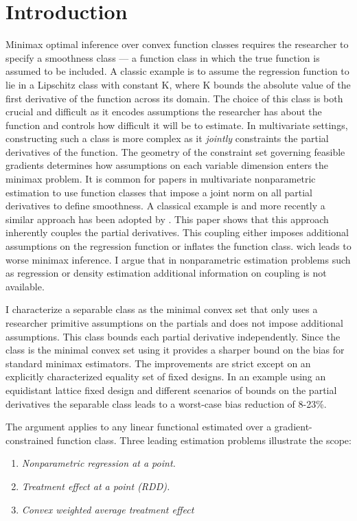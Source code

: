 
\section{Introduction}\label{sec:introduction}

Minimax optimal inference over convex function classes requires the researcher to specify a smoothness class --- a function class in which the true function is assumed to be included. A classic example is to assume the regression function to lie in a Lipschitz class with constant K, where K bounds the absolute value of the first derivative of the function across its domain. The choice of this class is both crucial and difficult as it encodes assumptions the researcher has about the function and controls how difficult it will be to estimate. In multivariate settings, constructing such a class is more complex as it \emph{jointly} constraints the partial derivatives of the function. The geometry of the constraint set governing feasible gradients determines how assumptions on each variable dimension enters the minimax problem.
It is common for papers in multivariate nonparametric estimation to use function classes that impose a joint norm on all partial derivatives to define smoothness. A classical example is \textcite{stone_optimal_1980} and more recently a similar approach has been adopted by \textcite{imbens_optimized_2019}.
This paper shows that this approach inherently couples the partial derivatives. This coupling either imposes additional assumptions on the regression function or inflates the function class. wich leads to worse minimax inference. I argue that in nonparametric estimation problems such as regression or density estimation additional information on coupling is not available. 


I characterize a separable class as the minimal convex set that only uses a researcher primitive assumptions on the partials and does not impose additional assumptions. This class bounds each partial derivative independently. Since the class is the minimal convex set using it provides a sharper bound on the bias for standard minimax estimators. The improvements are strict except on an explicitly characterized equality set of fixed designs. In an example using an equidistant lattice fixed design and different scenarios of bounds on the partial derivatives the separable class leads to a worst-case bias reduction of 8-23\%.


The argument applies to any linear functional estimated over a gradient-constrained function class.
Three leading estimation problems illustrate the scope:
\begin{enumerate}
	\item \emph{Nonparametric regression at a point.}

	\item \emph{Treatment effect at a point (RDD).}

	\item \emph{Convex weighted average treatment effect \parencite{imbens_optimized_2019}}
\end{enumerate}



